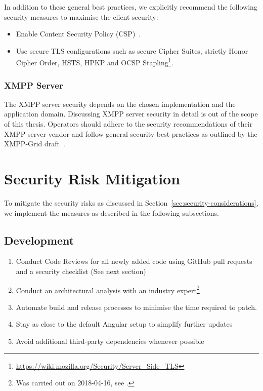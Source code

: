 In addition to these general best practices, we explicitly recommend the following security measures to maximise the client security:

\begin{itemize}
    \item Enable Content Security Policy (CSP)~\cite{w3c-csp}.
    \item Use secure TLS configurations such as secure Cipher Suites, strictly Honor Cipher Order, HSTS, HPKP and OCSP Stapling\footnote{\url{https://wiki.mozilla.org/Security/Server_Side_TLS}}.
\end{itemize}


\subsubsection{XMPP Server}

The XMPP server security depends on the chosen implementation and the application domain.
Discussing XMPP server security in detail is out of the scope of this thesis.
Operators should adhere to the security recommendations of their XMPP server vendor and follow general security best practices as outlined by the XMPP-Grid draft~\cite{ietf-mile-xmpp-grid-05}.

\section{Security Risk Mitigation}

To mitigate the security risks as discussed in Section~\ref{sec:security-considerations}, we implement the measures as described in the following subsections.

\subsection{Development}

\begin{enumerate}
    \item Conduct Code Reviews for all newly added code using GitHub pull requests and a security checklist (See next section)
    \item Conduct an architectural analysis with an industry expert\footnote{Was carried out on 2018-04-16, see .}
    \item Automate build and release processes to minimise the time required to patch.
    \item Stay as close to the default Angular setup to simplify further updates
    \item Avoid additional third-party dependencies whenever possible
\end{enumerate}

